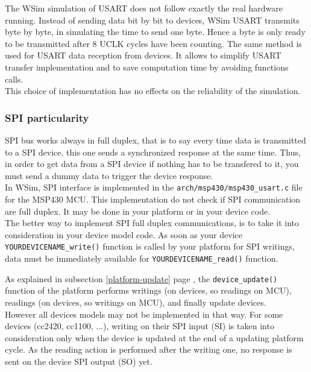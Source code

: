 \documentclass[a4paper,10pt]{report}
\begin{document}
The WSim simulation of USART does not follow exactly the real hardware running. Instead of sending data bit by bit to devices, WSim USART transmits byte by byte, in simulating the time to send one byte. Hence a byte is only ready to be transmitted after 8 UCLK cycles have been counting. The same method is used for USART data reception from devices.
It allows to simplify USART transfer implementation and to save computation time by avoiding functions calls.\\

This choice of implementation has no effects on the reliability of the simulation.


\subsubsection{SPI particularity}
SPI bus works always in full duplex, that is to say every time data is transmitted to a SPI device, this one sends a synchronized response at the same time. Thus, in order to get data from a SPI device if nothing has to be transfered to it, you must send a dummy data to trigger the device response.\\

In WSim, SPI interface is implemented in the \verb$arch/msp430/msp430_usart.c$ file for the MSP430 MCU. This implementation do not check if SPI communication are full duplex. It may be done in your platform or in your device code.\\

The better way to implement SPI full duplex communications, is to take it into consideration in your device model code. As soon as your device \verb$YOURDEVICENAME_write()$ function is called by your platform for SPI writings, data must be immediately available for \verb$YOURDEVICENAME_read()$ function.

As explained in subsection \ref{platform-update} page \pageref{platform-update}, the \verb$device_update()$ function of the platform performs writings (on devices, so readings on MCU), readings (on devices, so writings on MCU), and finally update devices.\\

However all devices models may not be implemented in that way. For some devices (cc2420, cc1100, ...), writing on their SPI input (SI) is taken into consideration only when the device is updated at the end of a updating platform cycle. As the reading action is performed after the writing one, no response is sent on the device SPI output (SO) yet.\\
\end{document}
